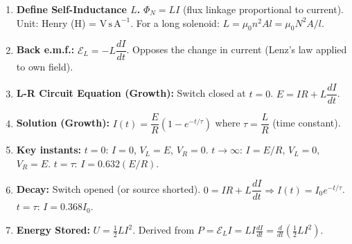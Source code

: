 \documentclass[11pt]{article}
\begin{document}
\begin{methode}
\begin{enumerate}
\item \textbf{Define Self-Inductance $L$.} $\Phi_N = LI$ (flux linkage proportional to current). Unit: Henry (H) = $\mathrm{V\,s\,A^{-1}}$. For a long solenoid: $L = \mu_0 n^2 A l = \mu_0 N^2 A / l$.
\item \textbf{Back e.m.f.:} $\mathcal{E}_L = -L \dfrac{dI}{dt}$. Opposes the change in current (Lenz's law applied to own field).
\item \textbf{L-R Circuit Equation (Growth):} Switch closed at $t=0$. $E = IR + L\dfrac{dI}{dt}$.
\item \textbf{Solution (Growth):} $I(t) = \dfrac{E}{R}\left(1 - e^{-t/\tau}\right)$ where $\tau = \dfrac{L}{R}$ (time constant).
\item \textbf{Key instants:} $t=0$: $I=0$, $V_L=E$, $V_R=0$. $t\to\infty$: $I=E/R$, $V_L=0$, $V_R=E$. $t=\tau$: $I = 0.632(E/R)$.
\item \textbf{Decay:} Switch opened (or source shorted). $0 = IR + L\dfrac{dI}{dt} \Rightarrow I(t) = I_0 e^{-t/\tau}$. $t=\tau$: $I = 0.368 I_0$.
\item \textbf{Energy Stored:} $U = \frac{1}{2}LI^2$. Derived from $P = \mathcal{E}_L I = L I \frac{dI}{dt} = \frac{d}{dt}(\frac{1}{2}LI^2)$.
\end{enumerate}
\end{methode}
\end{document}
